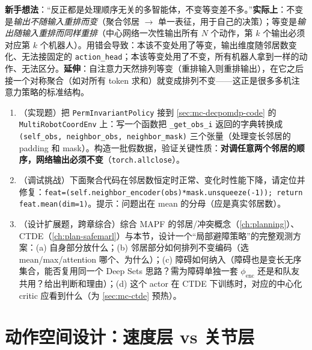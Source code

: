 \begin{pitfall}
\textbf{新手想法}：“反正都是处理顺序无关的多智能体，不变等变差不多。”\textbf{实际上}：不变是\emph{输出不随输入重排而变}（聚合邻居 $\to$ 单一表征，用于自己的决策）；等变是\emph{输出随输入重排而同样重排}（中心网络一次性输出所有 $N$ 个动作，第 $k$ 个输出必须对应第 $k$ 个机器人）。用错会导致：本该不变处用了等变，输出维度随邻居数变化、无法接固定的 \verb|action_head|；本该等变处用了不变，所有机器人拿到一样的动作、无法区分。\textbf{延伸}：自注意力天然排列等变（重排输入则重排输出），在它之后接一个对称聚合（如对所有 token 求和）就变成排列不变——这正是很多多机注意力策略的标准结构。
\end{pitfall}

\begin{practice}
\begin{enumerate}
  \item （实现题）把 \verb|PermInvariantPolicy| 接到 \cref{sec:mc-decpomdp-code} 的 \verb|MultiRobotCoordEnv| 上：写一个函数把 \verb|_get_obs_i| 返回的字典转换成 \verb|(self_obs, neighbor_obs, neighbor_mask)| 三个张量（处理变长邻居的 padding 和 mask）。构造一批假数据，验证关键性质：\textbf{对调任意两个邻居的顺序，网络输出必须不变}（\verb|torch.allclose|）。
  \item （调试挑战）下面聚合代码在邻居数恒定时正常、变化时性能下降，请定位并修复：\verb|feat=(self.neighbor_encoder(obs)*mask.unsqueeze(-1)); return feat.mean(dim=1)|。提示：问题出在 mean 的分母（应是真实邻居数）。
  \item （设计扩展题，跨章综合）综合 MAPF 的邻居/冲突概念（\cref{ch:planning}）、CTDE（\cref{ch:plan-safemarl}）与本节，设计一个“局部避障策略”的完整观测方案：(a) 自身部分放什么；(b) 邻居部分如何排列不变编码（选 mean/max/attention 哪个、为什么）；(c) 障碍如何纳入（障碍也是变长无序集合，能否复用同一个 Deep Sets 思路？需为障碍单独一套 $\phi_{\mathrm{enc}}$ 还是和队友共用？给出判断和理由）；(d) 这个 actor 在 CTDE 下训练时，对应的中心化 critic 应看到什么（为 \cref{sec:mc-ctde} 预热）。
\end{enumerate}
\end{practice}

\section{动作空间设计：速度层 vs 关节层}
\label{sec:mc-action}

